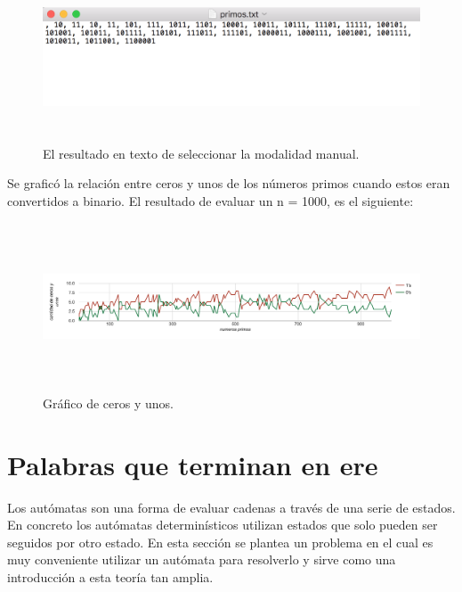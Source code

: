 \documentclass[12pt]{article}
\begin{document}
\begin{figure}[H]
\includegraphics[width=\textwidth, height=5cm]{primos_manual_texto}
\caption{El resultado en texto de seleccionar la modalidad manual.}
\label{fig:primos_manual}
\end{figure}

\newpage

Se graficó la relación entre ceros y unos de los números primos cuando estos eran convertidos a binario. El resultado de evaluar un n = 1000, es el siguiente:
\begin{figure}[H]
\includegraphics[width=\textwidth, height=5cm]{primos_grafica}
\caption{Gráfico de ceros y unos.}
\label{fig:primos_manual}
\end{figure}


\newpage
\section{Palabras que terminan en ere}
Los autómatas son una forma de evaluar cadenas a través de una serie de estados. En concreto los autómatas determinísticos utilizan estados que solo pueden ser seguidos por otro estado. En esta sección se plantea un problema en el cual es muy conveniente utilizar un autómata para resolverlo y sirve como una introducción a esta teoría tan amplia.
\end{document}
